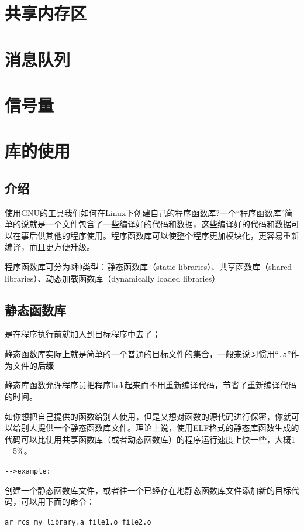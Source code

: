 \documentclass[UTF8,a4paper,12pt]{ctexbook}
\begin{document}
	\section{共享内存区}
	
	\section{消息队列}
	
	\section{信号量}
	
	\section{库的使用}
		\subsection{介绍}
			使用GNU的工具我们如何在Linux下创建自己的程序函数库?一个“程序函数库”简单的说就是一个文件包含了一些编译好的代码和数据，这些编译好的代码和数据可以在事后供其他的程序使用。程序函数库可以使整个程序更加模块化，更容易重新编译，而且更方便升级。  
			
			程序函数库可分为3种类型：静态函数库（static libraries）、共享函数库（shared libraries）、动态加载函数库（dynamically loaded libraries）
			
		\subsection{静态函数库}是在程序执行前就加入到目标程序中去了；
		
			静态函数库实际上就是简单的一个普通的目标文件的集合，一般来说习惯用“\verb|.a|”作为文件的\textbf{后缀}
			
			静态库函数允许程序员把程序link起来而不用重新编译代码，节省了重新编译代码的时间。
			
			如你想把自己提供的函数给别人使用，但是又想对函数的源代码进行保密，你就可以给别人提供一个静态函数库文件。理论上说，使用ELF格式的静态库函数生成的代码可以比使用共享函数库（或者动态函数库）的程序运行速度上快一些，大概1－5\%。
			
			\verb|-->example:|
			
			创建一个静态函数库文件，或者往一个已经存在地静态函数库文件添加新的目标代码，可以用下面的命令： 
			
			\verb|ar rcs my_library.a file1.o file2.o| 
			
\end{document}
